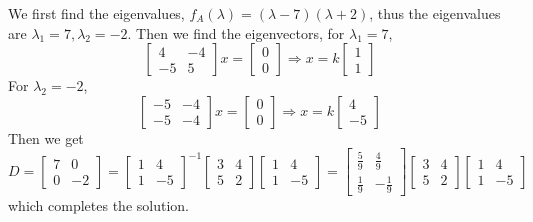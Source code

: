 \begin{solution}
  We first find the eigenvalues,
  $f_A(\lambda) = (\lambda - 7)(\lambda + 2)$,
  thus the eigenvalues are $\lambda_1 = 7, \lambda_2 = -2$.
  Then we find the eigenvectors,
  for $\lambda_1 = 7$,
  \begin{equation}
    \begin{bmatrix}
      4 & -4\\
      -5 & 5
    \end{bmatrix} x =
    \begin{bmatrix}
      0\\
      0
    \end{bmatrix} \Rightarrow x = k
    \begin{bmatrix}
      1\\
      1
    \end{bmatrix}
  \end{equation}
  For $\lambda_2 = -2$,
  \begin{equation}
    \begin{bmatrix}
      -5 & -4\\
      -5 & -4
    \end{bmatrix} x =
    \begin{bmatrix}
      0\\
      0
    \end{bmatrix} \Rightarrow x = k
    \begin{bmatrix}
      4\\
      -5
    \end{bmatrix}
  \end{equation}
  Then we get
  \begin{equation}
    D = \begin{bmatrix}
      7 & 0\\
      0 & -2
    \end{bmatrix}
     =
    \begin{bmatrix}
      1 & 4\\
      1 & -5
    \end{bmatrix}^{-1}
    \begin{bmatrix}
      3 & 4\\
      5 & 2
    \end{bmatrix}
    \begin{bmatrix}
      1 & 4\\
      1 & -5
    \end{bmatrix}
    = 
    \begin{bmatrix}
      \frac{5}{9} & \frac{4}{9}\\
      \frac{1}{9} & - \frac{1}{9}
    \end{bmatrix}
    \begin{bmatrix}
      3 & 4\\
      5 & 2
    \end{bmatrix}
    \begin{bmatrix}
      1 & 4\\
      1 & -5
    \end{bmatrix}
  \end{equation}
  which completes the solution.
\end{solution}

